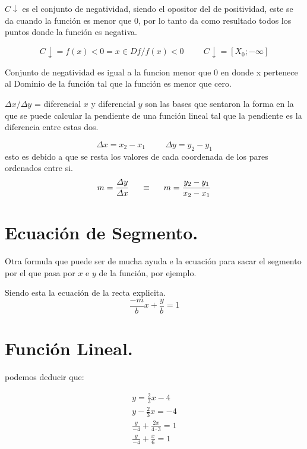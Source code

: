 \documentclass{article}
\begin{document}
	\vspace{1cm}
	
	
	$C\downarrow$ es el conjunto de negatividad, siendo el opositor del de positividad, este se da cuando la función es menor que 0, por lo tanto da como resultado todos los puntos donde la función es negativa.
	
	\begin{center}
		\begin{equation*}
			C\downarrow = f(x) < 0 = {x\in Df / f(x) < 0} \hspace{1cm} C\downarrow=[X_0;-\infty]
		\end{equation*}
	\end{center}
	Conjunto de negatividad es igual a la funcion menor que 0 en donde x pertenece al Dominio de la función tal que la función es menor que cero. 
	
	\vspace{1cm}
	
	$\varDelta x / \varDelta y$ = diferencial $x$ y diferencial $y$ son las bases que sentaron la forma en la que se puede calcular la pendiente de una función lineal tal que la pendiente es la diferencia entre estas dos.
	
	\begin{equation*}
		\varDelta x = x_2 - x_1 \hspace{1cm} \varDelta y = y_2 - y_1 
	\end{equation*} 
	esto es debido a que se resta los valores de cada coordenada de los pares ordenados entre si.
	\begin{equation*}
		m = \frac{\varDelta y}{\varDelta x }\hspace{0.5cm}\equiv\hspace{0.5cm} m = \frac{y_2 - y_1}{x_2 - x_1}
	\end{equation*}
	
	\section*{Ecuación de Segmento.}
	
	Otra formula que puede ser de mucha ayuda e la ecuación para sacar el segmento por el que pasa por $x$ e $y$ de la función, por ejemplo.
	
	Siendo esta la ecuación de la recta explicita.
	\begin{equation*}
		\frac{-m}{b}x + \frac{y}{b} = 1
	\end{equation*}
	\pagebreak
	\section*{Función Lineal.}
	podemos deducir que: 
	\begin{center}
		\begin{gather}
			 y = \frac{2}{3}x -4\\
			 y -\frac{2}{3}x = -4\\
			 \frac{y}{-4} + \frac{2x}{4 \cdot 3}= 1\\
			 \frac{y}{-4} + \frac{x}{6} = 1
		\end{gather}
	\end{center}
	
\end{document}
